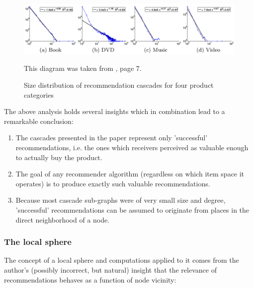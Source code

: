 	\begin{figure}[ht]
		\begin{center}
			\includegraphics[width=1\textwidth]{figures/rec_cascades_size_count}
			\caption{Size distribution of recommendation cascades for four product categories}
			\small
			This diagram was taken from \citep{RecCascades}, page 7.
			\label{fig:cascade_size_count}
		\end{center}
	\end{figure}
	
	The above analysis holds several insights which in combination lead to a remarkable conclusion:
	
	\begin{enumerate}
		\item The cascades presented in the paper represent only 'successful' recommendations, i.e. the ones which receivers perceived as valuable enough to actually buy the product.
		\item The goal of any recommender algorithm (regardless on which item space it operates) is to produce exactly such valuable recommendations.
		\item Because most cascade sub-graphs were of very small size and degree, 'successful' recommendations can be assumed to originate from places in the direct neighborhood of a node.
	\end{enumerate}
	
	
	\subsubsection{The local sphere}
	\label{sssect:the_local_sphere}
	
	The concept of a local sphere and computations applied to it comes from the author's (possibly incorrect, but natural) insight that the relevance of recommendations behaves as a function of node vicinity:
	
